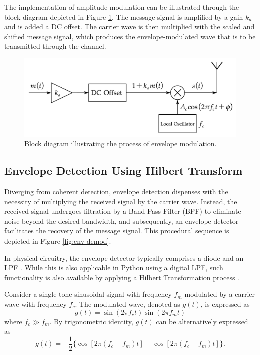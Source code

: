 \documentclass[../ECE459FinalProjectReport.tex]{subfiles}
\begin{document}
The implementation of amplitude modulation can be illustrated through the block diagram depicted in Figure \ref{fig:env-mod}. The message signal is amplified by a gain $k_a$ and is added a DC offset. The carrier wave is then multiplied with the scaled and shifted message signal, which produces the envelope-modulated wave that is to be transmitted through the channel.
\begin{figure}[tb]
    \centering
    \includegraphics[scale=0.5]{plots/env_mod.pdf}
    \caption{Block diagram illustrating the process of envelope modulation.}
    \label{fig:env-mod}
\end{figure}

\subsection{Envelope Detection Using Hilbert Transform}
Diverging from coherent detection, envelope detection dispenses with the necessity of multiplying the received signal by the carrier wave. Instead, the received signal undergoes filtration by a Band Pass Filter (BPF) to eliminate noise beyond the desired bandwidth, and subsequently, an envelope detector facilitates the recovery of the message signal. This procedural sequence is depicted in Figure \ref{fig:env-demod}.

In physical circuitry, the envelope detector typically comprises a diode and an LPF \cite{AnalogCommunicationAM}. While this is also applicable in Python using a digital LPF, such functionality is also available by applying a Hilbert Transformation process \cite{ulrichEnvelopeCalculationHilbert2006, XiXiaoShengPythonTiQuXinHaoDeBaoLuoGet2023}.

Consider a single-tone sinusoidal signal with frequency $f_m$ modulated by a carrier wave with frequency $f_c$. The modulated wave, denoted as $g(t)$, is expressed as
\begin{equation}
    g(t) = \sin\left(2\pi f_c t\right)\sin\left(2\pi f_m t\right)
\end{equation}
where $f_c\gg f_m$. By trigonometric identity, $g(t)$ can be alternatively expressed as
\begin{equation}
    g(t)=-\frac{1}{2}\{\cos\left[2\pi \left(f_c+f_m\right)t\right]-\cos\left[2\pi \left(f_c-f_m\right)t\right]\}.
\end{equation}
\end{document}
